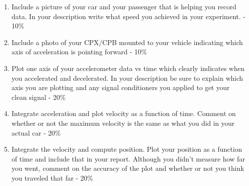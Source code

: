 \begin{enumerate}[itemsep=-5pt]
\item Include a picture of your car and your passenger that is helping you record data. In your description write what speed you achieved in your experiment. - 10\%
\item Include a photo of your CPX/CPB mounted to your vehicle indicating which axis of acceleration is pointing forward - 10\%
\item Plot one axis of your accelerometer data vs time which clearly indicates when you accelerated and decelerated. In your description be sure to explain which axis you are plotting and any signal conditioners you applied to get your clean signal - 20\%
\item Integrate acceleration and plot velocity as a function of time. Comment on whether or not the maximum velocity is the same as what you did in your actual car - 20\%
\item Integrate the velocity and compute position. Plot your position as a function of time and include that in your report. Although you didn't measure how far you went, comment on the accuracy of the plot and whether or not you think you traveled that far - 20\%
\end{enumerate}
